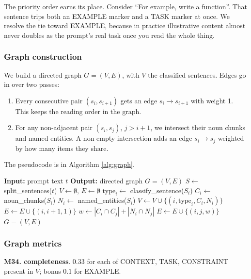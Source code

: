 \documentclass[conference]{IEEEtran}
\begin{document}
The priority order earns its place. Consider ``For example, write a function''. That sentence trips both an EXAMPLE marker and a TASK marker at once. We resolve the tie toward EXAMPLE, because in practice illustrative content almost never doubles as the prompt's real task once you read the whole thing.

\subsubsection{Graph construction}
We build a directed graph $G = (V, E)$, with $V$ the classified sentences. Edges go in over two passes:
\begin{enumerate}
\item Every consecutive pair $(s_i, s_{i+1})$ gets an edge $s_i \to s_{i+1}$ with weight 1. This keeps the reading order in the graph.
\item For any non-adjacent pair $(s_i, s_j)$, $j > i+1$, we intersect their noun chunks and named entities. A non-empty intersection adds an edge $s_i \to s_j$ weighted by how many items they share.
\end{enumerate}

The pseudocode is in Algorithm \ref{alg:graph}.

\begin{algorithm}[t]
\caption{Discourse Graph Construction}
\label{alg:graph}
\begin{algorithmic}[1]
\STATE \textbf{Input:} prompt text $t$
\STATE \textbf{Output:} directed graph $G = (V, E)$
\STATE $S \leftarrow$ split\_sentences($t$)
\STATE $V \leftarrow \emptyset$, $E \leftarrow \emptyset$
    \STATE $\text{type}_i \leftarrow$ classify\_sentence($S_i$)
    \STATE $C_i \leftarrow$ noun\_chunks($S_i$)
    \STATE $N_i \leftarrow$ named\_entities($S_i$)
    \STATE $V \leftarrow V \cup \{(i, \text{type}_i, C_i, N_i)\}$
\ENDFOR
{}
    \STATE $E \leftarrow E \cup \{(i, i+1, 1)\}$
\ENDFOR
{}
        \STATE $w \leftarrow |C_i \cap C_j| + |N_i \cap N_j|$
            \STATE $E \leftarrow E \cup \{(i, j, w)\}$
        \ENDIF
    \ENDFOR
\ENDFOR
\RETURN $G = (V, E)$
\end{algorithmic}
\end{algorithm}

\subsubsection{Graph metrics}
\textbf{M34. completeness}. $0.33$ for each of CONTEXT, TASK, CONSTRAINT present in $V$; bonus $0.1$ for EXAMPLE.
\end{document}
